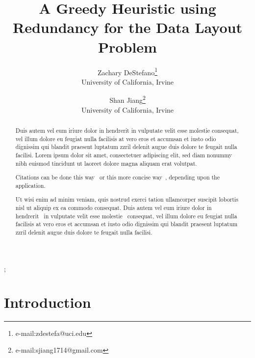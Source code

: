 \documentclass[conference]{acmsiggraph}
\title{A Greedy Heuristic using Redundancy for the Data Layout Problem}
\author{Zachary DeStefano\thanks{e-mail:zdestefa@uci.edu}\\University of California, Irvine}
\author{Shan Jiang\thanks{e-mail:sjiang1714@gmail.com}\\University of California, Irvine}
\begin{document}

\maketitle

\begin{abstract}

Duis autem vel eum iriure dolor in hendrerit in vulputate velit esse
molestie consequat, vel illum dolore eu feugiat nulla facilisis at 
vero eros et accumsan et iusto odio dignissim qui blandit praesent
luptatum zzril delenit augue duis dolore te feugait nulla
facilisi. Lorem ipsum dolor sit amet, consectetuer adipiscing elit,
sed diam nonummy nibh euismod tincidunt ut laoreet dolore magna
aliquam erat volutpat.

Citations can be done this way~\cite{Jobs95} or this more concise 
way~, depending upon the application.

Ut wisi enim ad minim veniam, quis nostrud exerci tation ullamcorper
suscipit lobortis nisl ut aliquip ex ea commodo consequat. Duis autem
vel eum iriure dolor in hendrerit~\cite{Pellacini:2005:LAH}
in vulputate velit esse molestie~\cite{notes2002} 
consequat, vel illum dolore eu feugiat nulla facilisis at vero eros et
accumsan et iusto odio dignissim qui blandit praesent luptatum zzril
delenit augue duis dolore te feugait nulla facilisi.~\cite{Park:2006:DSI}

\end{abstract}

\begin{CRcatlist}
  ;
\end{CRcatlist}

\keywordlist


\TOGlinkslist


\copyrightspace

\section{Introduction}
\end{document}
